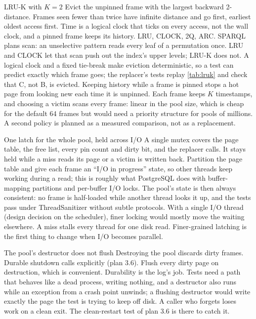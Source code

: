 \begin{decision}{LRU-K with $K = 2$}
 Evict the unpinned frame with the largest backward 2-distance.
Frames seen fewer than twice have infinite distance and go first, earliest
oldest access first. Time is a logical clock that ticks on every access, not
the wall clock, and a pinned frame keeps its history.
 LRU, CLOCK, 2Q, ARC.
 SPARQL plans scan: an unselective pattern reads every leaf of a
permutation once. LRU and CLOCK let that scan push out the index's upper levels;
LRU-K does not. A logical clock and a fixed tie-break make eviction
deterministic, so a test can predict exactly which frame goes; the replacer's
tests replay \cref{tab:lruk} and check that C, not B, is evicted. Keeping
history while a frame is pinned stops a hot page from looking new each time it
is unpinned.
 Each frame keeps $K$ timestamps, and choosing a victim scans every
frame: linear in the pool size, which is cheap for the default 64 frames but
would need a priority structure for pools of millions. A second policy is
planned as a measured comparison, not as a replacement.
\end{decision}

\begin{decision}{One latch for the whole pool, held across I/O}
 A single mutex covers the page table, the free list, every pin
count and dirty bit, and the replacer calls. It stays held while a miss reads
its page or a victim is written back.
 Partition the page table and give each frame an
``I/O in progress'' state, so other threads keep working during a read; this is
roughly what PostgreSQL does with buffer-mapping partitions and per-buffer I/O
locks.
 The pool's state is then always consistent: no frame is
half-loaded while another thread looks it up, and the tests pass under
ThreadSanitizer without subtle protocols. With a single I/O thread
(design decision on the scheduler), finer locking would mostly move the
waiting elsewhere.
 A miss stalls every thread for one disk read. Finer-grained
latching is the first thing to change when I/O becomes parallel.
\end{decision}

\begin{decision}{The pool's destructor does not flush}
 Destroying the pool discards dirty frames. Durable shutdown
calls  explicitly (plan 3.6).
 Flush every dirty page on destruction, which is
convenient.
 Durability is the log's job. Tests need a path that behaves like a
dead process, writing nothing, and a destructor also runs while an exception
from a crash point unwinds; a flushing destructor would write exactly the page
the test is trying to keep off disk.
 A caller who forgets  loses work on a clean
exit. The clean-restart test of plan 3.6 is there to catch it.
\end{decision}

